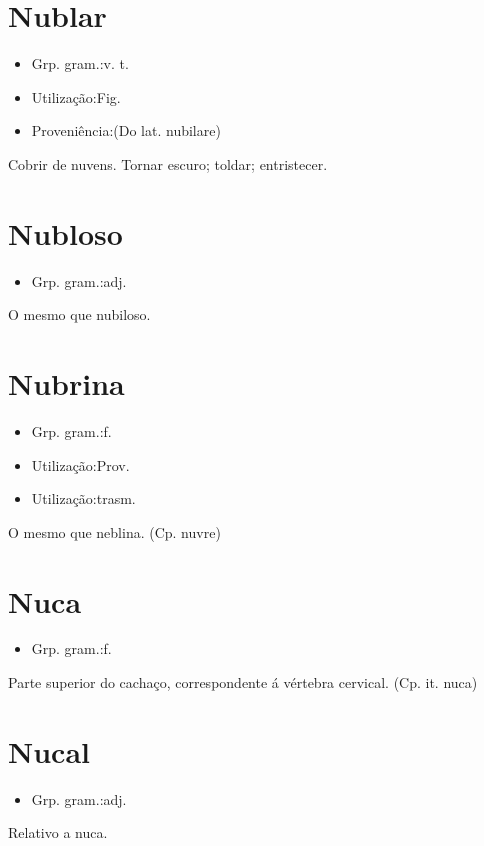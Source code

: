 \section{Nublar}
\begin{itemize}
\item {Grp. gram.:v. t.}
\end{itemize}
\begin{itemize}
\item {Utilização:Fig.}
\end{itemize}
\begin{itemize}
\item {Proveniência:(Do lat. \textunderscore nubilare\textunderscore )}
\end{itemize}
Cobrir de nuvens.
Tornar escuro; toldar; entristecer.
\section{Nubloso}
\begin{itemize}
\item {Grp. gram.:adj.}
\end{itemize}
O mesmo que \textunderscore nubiloso\textunderscore .
\section{Nubrina}
\begin{itemize}
\item {Grp. gram.:f.}
\end{itemize}
\begin{itemize}
\item {Utilização:Prov.}
\end{itemize}
\begin{itemize}
\item {Utilização:trasm.}
\end{itemize}
O mesmo que \textunderscore neblina\textunderscore .
(Cp. \textunderscore nuvre\textunderscore )
\section{Nuca}
\begin{itemize}
\item {Grp. gram.:f.}
\end{itemize}
Parte superior do cachaço, correspondente á vértebra cervical.
(Cp. it. \textunderscore nuca\textunderscore )
\section{Nucal}
\begin{itemize}
\item {Grp. gram.:adj.}
\end{itemize}
Relativo a nuca.
